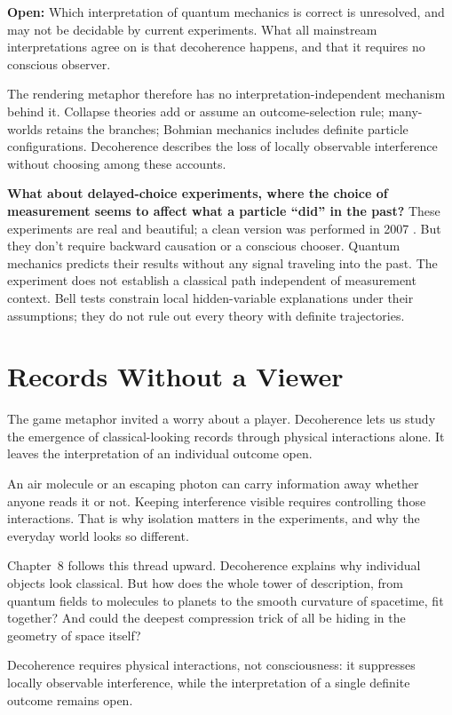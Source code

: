 \begin{researchnotebox}
\textbf{Open:} Which interpretation of quantum mechanics is correct is unresolved, and may not be decidable by current experiments. What all mainstream interpretations agree on is that decoherence happens, and that it requires no conscious observer.
\end{researchnotebox}

The rendering metaphor therefore has no interpretation-independent mechanism behind it. Collapse theories add or assume an outcome-selection rule; many-worlds retains the branches; Bohmian mechanics includes definite particle configurations. Decoherence describes the loss of locally observable interference without choosing among these accounts.

\begin{commonquestionbox}
\textbf{What about delayed-choice experiments, where the choice of measurement seems to affect what a particle ``did'' in the past?} These experiments are real and beautiful; a clean version was performed in 2007 \cite{jacques2007}. But they don't require backward causation or a conscious chooser. Quantum mechanics predicts their results without any signal traveling into the past. The experiment does not establish a classical path independent of measurement context. Bell tests constrain local hidden-variable explanations under their assumptions; they do not rule out every theory with definite trajectories.
\end{commonquestionbox}

\section{Records Without a Viewer}

The game metaphor invited a worry about a player. Decoherence lets us study the emergence of classical-looking records through physical interactions alone. It leaves the interpretation of an individual outcome open.

An air molecule or an escaping photon can carry information away whether anyone reads it or not. Keeping interference visible requires controlling those interactions. That is why isolation matters in the experiments, and why the everyday world looks so different.

Chapter~8 follows this thread upward. Decoherence explains why individual objects look classical. But how does the whole tower of description, from quantum fields to molecules to planets to the smooth curvature of spacetime, fit together? And could the deepest compression trick of all be hiding in the geometry of space itself?

\begin{keytakeawaybox}
Decoherence requires physical interactions, not consciousness: it suppresses locally observable interference, while the interpretation of a single definite outcome remains open.
\end{keytakeawaybox}

